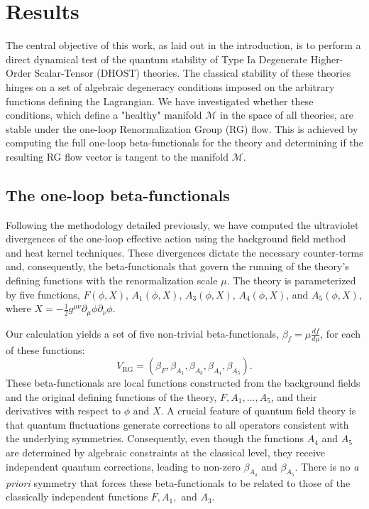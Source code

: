 \documentclass[twocolumn]{aastex631}
\begin{document}
\section{Results}
\label{sec:results}
The central objective of this work, as laid out in the introduction, is to perform a direct dynamical test of the quantum stability of Type Ia Degenerate Higher-Order Scalar-Tensor (DHOST) theories. The classical stability of these theories hinges on a set of algebraic degeneracy conditions imposed on the arbitrary functions defining the Lagrangian. We have investigated whether these conditions, which define a "healthy" manifold $\mathcal{M}$ in the space of all theories, are stable under the one-loop Renormalization Group (RG) flow. This is achieved by computing the full one-loop beta-functionals for the theory and determining if the resulting RG flow vector is tangent to the manifold $\mathcal{M}$.

\subsection{The one-loop beta-functionals}

Following the methodology detailed previously, we have computed the ultraviolet divergences of the one-loop effective action using the background field method and heat kernel techniques. These divergences dictate the necessary counter-terms and, consequently, the beta-functionals that govern the running of the theory's defining functions with the renormalization scale $\mu$. The theory is parameterized by five functions, $F(\phi,X)$, $A_1(\phi,X)$, $A_3(\phi,X)$, $A_4(\phi,X)$, and $A_5(\phi,X)$, where $X = - \frac{1}{2} g^{\mu\nu} \partial_\mu\phi \partial_\nu\phi$.

Our calculation yields a set of five non-trivial beta-functionals, $\beta_f = \mu \frac{df}{d\mu}$, for each of these functions:
\begin{equation}
    V_{\text{RG}} = (\beta_F, \beta_{A_1}, \beta_{A_3}, \beta_{A_4}, \beta_{A_5}).
\end{equation}
These beta-functionals are local functions constructed from the background fields and the original defining functions of the theory, $F, A_1, \dots, A_5$, and their derivatives with respect to $\phi$ and $X$. A crucial feature of quantum field theory is that quantum fluctuations generate corrections to all operators consistent with the underlying symmetries. Consequently, even though the functions $A_4$ and $A_5$ are determined by algebraic constraints at the classical level, they receive independent quantum corrections, leading to non-zero $\beta_{A_4}$ and $\beta_{A_5}$. There is no \textit{a priori} symmetry that forces these beta-functionals to be related to those of the classically independent functions $F, A_1,$ and $A_3$.
\end{document}
